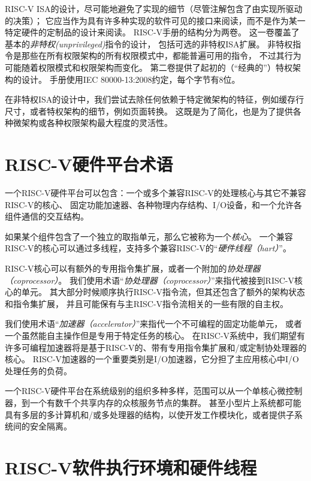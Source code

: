 RISC-V ISA的设计，尽可能地避免了实现的细节（尽管注解包含了由实现所驱动的决策）；
它应当作为具有许多种实现的软件可见的接口来阅读，而不是作为某一特定硬件的定制品的设计来阅读。
RISC-V手册的结构分为两卷。
这一卷覆盖了基本的{\em 非特权(unprivileged)}指令的设计，
包括可选的非特权ISA扩展。
非特权指令是那些在所有权限架构的所有权限模式中，都能普遍可用的指令，
不过其行为可能随着权限模式和权限架构而变化。
第二卷提供了起初的（“经典的”）特权架构的设计。
手册使用IEC 80000-13:2008约定，每个字节有8位。


\begin{commentary}
  在非特权ISA的设计中，我们尝试去除任何依赖于特定微架构的特征，例如缓存行尺寸，或者特权架构的细节，例如页面转换。
  这既是为了简化，也是为了提供各种微架构或各种权限架构最大程度的灵活性。

\end{commentary}


\section{RISC-V硬件平台术语}

一个RISC-V硬件平台可以包含：一个或多个兼容RISC-V的处理核心与其它不兼容RISC-V的核心、
固定功能加速器、各种物理内存结构、I/O设备，和一个允许各组件通信的交互结构。

如果某个组件包含了一个独立的取指单元，那么它被称为一个{\em 核心}。
一个兼容RISC-V的核心可以通过多线程，支持多个兼容RISC-V的“{\em 硬件线程（hart）}”。

RISC-V核心可以有额外的专用指令集扩展，或者一个附加的{\em 协处理器（coprocessor）}。
我们使用术语“{\em 协处理器（coprocessor）}”来指代被接到RISC-V核心的单元。
其大部分时候顺序执行RISC-V指令流，但其还包含了额外的架构状态和指令集扩展，
并且可能保有与主RISC-V指令流相关的一些有限的自主权。

我们使用术语“{\em 加速器（accelerator）}”来指代一个不可编程的固定功能单元，
或者一个虽然能自主操作但是专用于特定任务的核心。
在RISC-V系统中，我们期望有许多可编程加速器将是基于RISC-V的、带有专用指令集扩展和/或定制协处理器的核心。
RISC-V加速器的一个重要类别是I/O加速器，它分担了主应用核心中I/O处理任务的负荷。

一个RISC-V硬件平台在系统级别的组织多种多样，范围可以从一个单核心微控制器，到一个有数千个共享内存的众核服务节点的集群。
甚至小型片上系统都可能具有多层的多计算机和/或多处理器的结构，以使开发工作模块化，或者提供子系统间的安全隔离。

\section{RISC-V软件执行环境和硬件线程}

